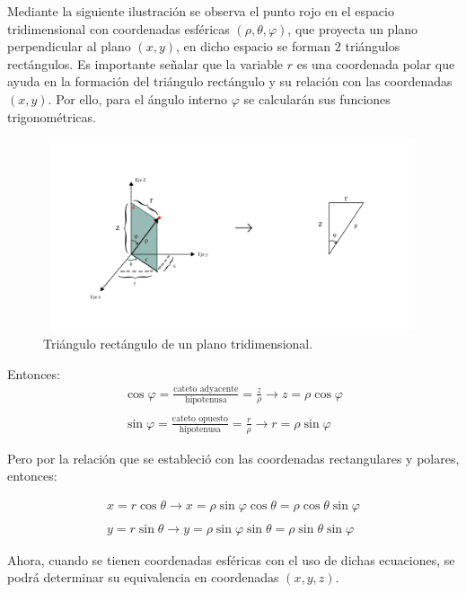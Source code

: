 Mediante la siguiente ilustración se observa el punto rojo en el espacio tridimensional con coordenadas esféricas ${\left(\rho,\theta,\varphi\right)}$, que proyecta un plano perpendicular al plano ${\left(x,y\right)}$, en dicho espacio se forman ${2}$ triángulos rectángulos. Es importante señalar que la variable ${r}$ es una coordenada polar que ayuda en la formación del triángulo rectángulo y su relación con las coordenadas ${\left(x,y\right)}$. Por ello, para el ángulo interno ${\varphi}$ se calcularán sus funciones trigonométricas.

\begin{figure}[H]
  \centering
  \includegraphics[width=11.17cm, height=5.67cm]{img/graph/coord_esf_2_rect_1.jpg}
  \caption{Triángulo rectángulo de un plano tridimensional.}
  \label{relacion_de_coordenadas}
\end{figure}

Entonces:
\begin{eqnarray*}
  \cos \varphi = \frac{\text{cateto adyacente}}{\text{hipotenusa}} = \frac{z}{\rho} \rightarrow z = \rho \cos \varphi\\\\
  \sin \varphi = \frac{\text{cateto opuesto}}{\text{hipotenusa}} = \frac{r}{\rho} \rightarrow r = \rho \sin \varphi
\end{eqnarray*}

\vspace{4mm}
Pero por la relación que se estableció con las coordenadas rectangulares y polares, entonces:

\begin{eqnarray*}
  x = r \cos \theta \rightarrow x = \rho \sin \varphi \cos \theta = \rho \cos \theta \sin \varphi\\\\
  y = r \sin \theta \rightarrow y = \rho \sin \varphi \sin \theta = \rho \sin \theta \sin \varphi
\end{eqnarray*}

\vspace{4mm}
Ahora, cuando se tienen coordenadas esféricas con el uso de dichas ecuaciones, se podrá determinar su equivalencia en coordenadas ${\left(x,y,z\right)}$.